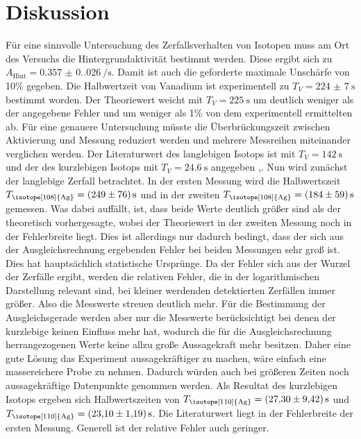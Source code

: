\section{Diskussion}
Für eine sinnvolle Untersuchung des Zerfallsverhalten von Isotopen muss am
Ort des Versuchs die Hintergrundaktivität bestimmt werden. Diese ergibt sich zu 
$A_\text{Hint}=\qty{0.357(0.026)}{\per\s}$. Damit ist auch die geforderte maximale Unschärfe von 
10\% gegeben. Die Halbwertzeit von Vanadium ist experimentell zu $T_V=\qty{224(7)}{\second}$ bestimmt worden. Der Theoriewert weicht mit
$T_V=\qty{225}{\second}$ \cite{V52} um deutlich weniger als der angegebene Fehler und um weniger als 1\% von dem experimentell ermittelten ab. Für 
eine genauere Untersuchung müsste die Überbrückungszeit zwischen Aktivierung und Messung reduziert werden und mehrere Messreihen miteinander
verglichen werden. Der Literaturwert des langlebigen Isotops  ist mit
$T_V=\qty{142}{\second}$ und der des kurzlebigen Isotops  mit  $T_V=\qty{24.6}{\second}$ angegeben \cite{Ag108},\cite{Ag110}.
Nun wird zunächst der langlebige Zerfall betrachtet. In der ersten Messung wird die Halbwertszeit $T_\text{\isotope[108]{Ag}}=\qty{249(76)}{\second} $
und in der zweiten $T_\text{\isotope[108]{Ag}}=\qty{184(59)}{\second} $ gemessen. Was dabei auffällt, ist, dass 
beide Werte deutlich größer sind als der theoretisch vorhergesagte, wobei der Theoriewert in der zweiten Messung noch in der Fehlerbreite liegt. 
Dies ist allerdings nur dadurch bedingt, dass der sich aus der Ausgleichsrechnung ergebenden Fehler bei beiden Messungen sehr groß ist.
Dies hat hauptsächlich statistische Ursprünge. Da der Fehler sich aus der Wurzel der Zerfälle ergibt, werden die relativen Fehler, die 
in der logarithmischen Darstellung relevant sind, bei kleiner werdenden detektierten Zerfällen immer größer. Also die Messwerte streuen deutlich mehr.
Für die Bestimmung der Ausgleichsgerade werden aber nur die Messwerte berücksichtigt bei denen 
der kurzlebige keinen Einfluss mehr hat, wodurch die für die Ausgleichsrechnung herrangezogenen Werte 
keine allzu große Aussagekraft mehr besitzen. Daher eine gute Lösung das Experiment aussagekräftiger zu machen, wäre einfach eine massereichere 
Probe zu nehmen. Dadurch würden auch bei größeren Zeiten noch aussagekräftige Datenpunkte genommen werden. 
Als Resultat des kurzlebigen Isotops ergeben sich Halbwertszeiten von $T_\text{\isotope[110]{Ag}}=\qty{27.3(9.42)}{\second}$ und 
$T_\text{\isotope[110]{Ag}}=\qty{23.1(1.19)}{\second}$. Die Literaturwert liegt in der Fehlerbreite der ersten Messung. Generell ist der relative Fehler auch geringer. 
